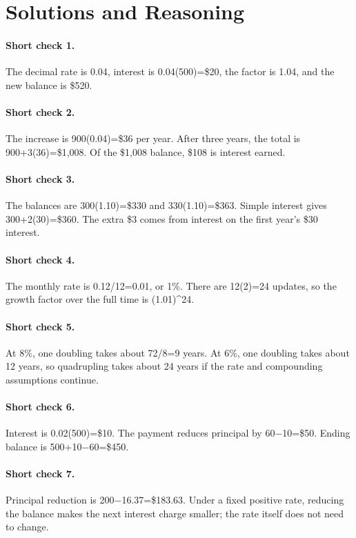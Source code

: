 \documentclass[11pt,letterpaper]{article}
\begin{document}
\clearpage
{\setlength{\parskip}{4pt}
\section*{Solutions and Reasoning}

\paragraph{Short check 1.}
The decimal rate is 0.04, interest is 0.04(500)=\$20, the factor is 1.04, and the new balance is \$520.


\paragraph{Short check 2.}
The increase is 900(0.04)=\$36 per year. After three years, the total is 900+3(36)=\$1,008. Of the \$1,008 balance, \$108 is interest earned.


\paragraph{Short check 3.}
The balances are 300(1.10)=\$330 and 330(1.10)=\$363. Simple interest gives 300+2(30)=\$360. The extra \$3 comes from interest on the first year's \$30 interest.


\paragraph{Short check 4.}
The monthly rate is 0.12/12=0.01, or 1\%. There are 12(2)=24 updates, so the growth factor over the full time is (1.01)\textasciicircum{}24.


\paragraph{Short check 5.}
At 8\%, one doubling takes about 72/8=9 years. At 6\%, one doubling takes about 12 years, so quadrupling takes about 24 years if the rate and compounding assumptions continue.


\paragraph{Short check 6.}
Interest is 0.02(500)=\$10. The payment reduces principal by 60$-$10=\$50. Ending balance is 500+10$-$60=\$450.


\paragraph{Short check 7.}
Principal reduction is 200$-$16.37=\$183.63. Under a fixed positive rate, reducing the balance makes the next interest charge smaller; the rate itself does not need to change.


}
\end{document}
